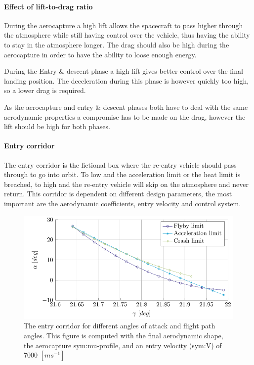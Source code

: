 \paragraph{Effect of lift-to-drag ratio}
During the aerocapture a high lift allows the spacecraft to pass higher through the atmosphere while still having control over the vehicle, thus having the ability to stay in the atmosphere longer. The drag should also be high during the aerocapture in order to have the ability to loose enough energy.

During the Entry \& descent phase a high lift gives better control over the final landing position. The deceleration during this phase is however quickly too high, so a lower drag is required.

As the aerocapture and entry \& descent phases both have to deal with the same aerodynamic properties a compromise has to be made on the drag, however the lift should be high for both phases.

\paragraph{Entry corridor}
The entry corridor is the fictional box where the re-entry vehicle should pass through to go into orbit. To low and the acceleration limit or the heat limit is breached, to high and the re-entry vehicle will skip on the atmosphere and never return. This corridor is dependent on different design parameters, the most important are the aerodynamic coefficients, entry velocity and control system.

\begin{figure}[h]
	\centering
	\includegraphics[width=\textwidth]{./Figure/orbit/alpha_gamma.pdf}
	\caption[The entry corridor for different angles of attack and flight path angles]{The entry corridor for different angles of attack and flight path angles. This figure is computed with the final aerodynamic shape, the aerocapture \gls{sym:mu}-profile, and an entry velocity (\gls{sym:V}) of 7000 $\left[m s^{-1}\right]$}
	\label{fig:alpha_gamma}
\end{figure}

